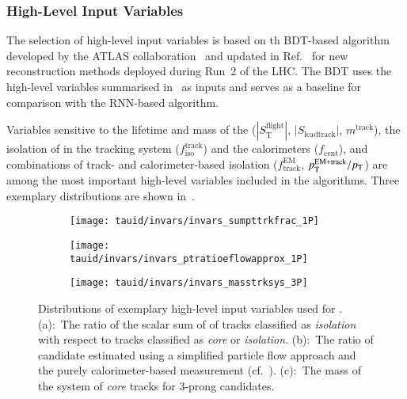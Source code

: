 \subsubsection{High-Level Input Variables}

The selection of high-level input variables is based on th BDT-based
\tauid algorithm developed by the ATLAS
collaboration~\cite{ATL-PHYS-PUB-2015-045} and updated in
Ref.~\cite{cdeutsch-master} for new \tauhadvis reconstruction methods
deployed during Run~2 of the LHC. The BDT \tauid uses the high-level
variables summarised in~ as inputs and
serves as a baseline for comparison with the RNN-based algorithm.

Variables sensitive to the lifetime and mass of the \taulepton
($|S_{\text{T}}^{\text{flight}}|$, $|S_{\text{leadtrack}}|$,
$m^{\text{track}}$), the isolation of \tauhadvis in the tracking
system ($f_{\text{iso}}^{\text{track}}$) and the calorimeters
($f_{\text{cent}}$), and combinations of track- and calorimeter-based
isolation ($f_{\text{track}}^{\text{EM}}$,
$p_{\text{T}}^{\text{EM+track}} / p_{\text{T}}$) are among the most important
high-level variables included in the \tauid algorithms. Three
exemplary distributions are shown in~.


\begin{figure}[htbp]
  \centering

  \begin{subfigure}{0.33\textwidth}
    \texttt{[image: tauid/invars/invars\_sumpttrkfrac\_1P]}
    \subcaption{}
  \end{subfigure}\hfill%
  \begin{subfigure}{0.33\textwidth}
    \texttt{[image: tauid/invars/invars\_ptratioeflowapprox\_1P]}
    \subcaption{}
  \end{subfigure}\hfill%
  \begin{subfigure}{0.33\textwidth}
    \texttt{[image: tauid/invars/invars\_masstrksys\_3P]}
    \subcaption{}
  \end{subfigure}

  \caption{Distributions of exemplary high-level input variables used
    for \tauid. (a):~The ratio of the scalar sum of \pT of tracks
    classified as \emph{isolation} with respect to tracks classified
    as \emph{core} or \emph{isolation}. (b):~The ratio of \tauhadvis
    candidate \pT estimated using a simplified particle flow approach
    and the purely calorimeter-based measurement
    (cf.~). (c):~The mass of the
    system of \emph{core} tracks for 3-prong \tauhadvis candidates.}%
  \label{fig:tauid_high_level_vars}
\end{figure}


